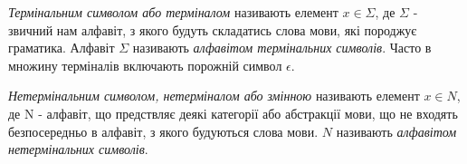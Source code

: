\begin{definition}
  \textit{Термінальним символом або терміналом} називають елемент $ x \in \Sigma $, де $\Sigma$
  - звичний нам алфавіт, з якого будуть складатись слова мови, які породжує граматика. Алфавіт $\Sigma$ називають
  \textit{алфавітом термінальних символів}. Часто в множину терміналів включають порожній символ $ \epsilon $.
\end{definition}

\begin{definition}
  \textit{Нетермінальним символом, нетерміналом або змінною} називають елемент $ x \in N $, де N - алфавіт, що предствляє деякі категорії або абстракції мови, що не
  входять безпосередньо в алфавіт, з якого будуються слова мови. $N$ називають \textit{алфавітом нетермінальних символів}.
\end{definition}

